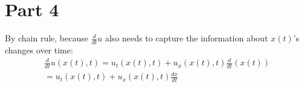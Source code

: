 \documentclass{article}
\begin{document}
\section*{Part 4}
By chain rule, because $\frac{d}{dt}u$ also needs to capture the information about $x(t)$'s changes over time:
\begin{equation}
\begin{aligned}
\frac{d}{dt}u(x(t), t) = u_t(x(t), t) + u_x(x(t), t)\frac{d}{dt}(x(t))\\
= u_t(x(t), t) + u_x(x(t), t)\frac{dx}{dt}
\end{aligned}
\end{equation}
\end{document}
